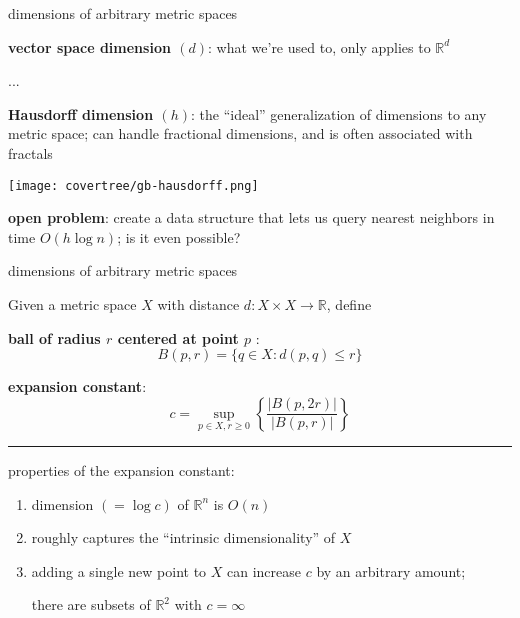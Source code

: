 \begin{frame}[fragile]{dimensions of arbitrary metric spaces}

\textbf{vector space dimension $(d)$}: what we're used to, only applies to $\mathbb{R}^d$
\vspace{0.05in}

\hspace{0.2in}...

\vspace{0.05in}
\textbf{Hausdorff dimension $(h)$}: the ``ideal'' generalization of dimensions to any metric space; can handle fractional dimensions, and is often associated with fractals
\begin{center}
\texttt{[image: covertree/gb-hausdorff.png]}
\end{center}


\textbf{open problem}: create a data structure that lets us query nearest neighbors in time $O(h \log n)$; is it even possible?
\end{frame}


\begin{frame}[fragile]{dimensions of arbitrary metric spaces}

Given a metric space $X$ with distance $d : X \times X \to \mathbb{R}$, define
\vspace{0.15in}

\textbf{ball of radius $r$ centered at point $p$ }:
$$
B(p,r) = \{q \in X : d(p,q) \le r \}
$$


\textbf{expansion constant}:
$$
c = \sup_{p\in X, r\ge0} \left\{
    \frac{|B(p,2r)|}{|B(p,r)|}
      \right\}
$$

\hrule

\vspace{0.15in}
properties of the expansion constant:
\begin{enumerate}
\item dimension $(=\log c)$ of $\mathbb{R}^n$ is $O(n)$
\item roughly captures the ``intrinsic dimensionality'' of $X$
\item adding a single new point to $X$ can increase $c$ by an arbitrary amount;

there are subsets of $\mathbb{R}^2$ with $c=\infty$
\end{enumerate}

\end{frame}

